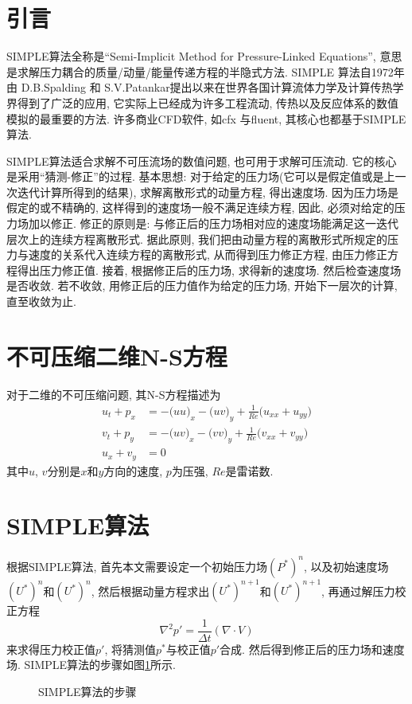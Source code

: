 \documentclass[a4paper,boxed,11pt]{caspset}
\begin{document}

\section{引言}
SIMPLE算法全称是``Semi-Implicit Method for Pressure-Linked Equations'',
意思是求解压力耦合的质量/动量/能量传递方程的半隐式方法. SIMPLE 算法自1972年由
D.B.Spalding 和 S.V.Patankar提出以来在世界各国计算流体力学及计算传热学界得到了广泛的应用,
它实际上已经成为许多工程流动, 传热以及反应体系的数值模拟的最重要的方法. 许多商业CFD软件, 如cfx 与fluent, 其核心也都基于SIMPLE
算法.

SIMPLE算法适合求解不可压流场的数值问题, 也可用于求解可压流动. 它的核心是采用``猜测-修正''的过程. 基本思想: 对于给定的压力场(它可以是假定值或是上一次迭代计算所得到的结果),
求解离散形式的动量方程, 得出速度场. 因为压力场是假定的或不精确的, 这样得到的速度场一般不满足连续方程, 因此, 必须对给定的压力场加以修正.
修正的原则是: 与修正后的压力场相对应的速度场能满足这一迭代层次上的连续方程离散形式. 据此原则, 我们把由动量方程的离散形式所规定的压力与速度的关系代入连续方程的离散形式,
从而得到压力修正方程, 由压力修正方程得出压力修正值. 接着, 根据修正后的压力场, 求得新的速度场. 然后检查速度场是否收敛. 若不收敛,
用修正后的压力值作为给定的压力场, 开始下一层次的计算, 直至收敛为止.
\section{不可压缩二维N-S方程}

对于二维的不可压缩问题, 其N-S方程描述为
\begin{align}
u_{t}+p_{x} & =-\big(uu\big)_{x}-\big(uv\big)_{y}+\frac{1}{Re}\big(u_{xx}+u_{yy}\big)\label{momentumU}\\
v_{t}+p_{y} & =-\big(uv\big)_{x}-\big(vv\big)_{y}+\frac{1}{Re}\big(v_{xx}+v_{yy}\big)\label{momentumV}\\
u_{x}+v_{y} & =0
\end{align}
其中$u$, $v$分别是$x$和$y$方向的速度, $p$为压强, $Re$是雷诺数.


\section{SIMPLE算法}

根据SIMPLE算法, 首先本文需要设定一个初始压力场$(P^{*})^{n}$, 以及初始速度场$(U^{*})^{n}$和$(U^{*})^{n}$,
然后根据动量方程求出$(U^{*})^{n+1}$和$(U^{*})^{n+1}$, 再通过解压力校正方程
\[
\nabla^{2}p'=\frac{1}{\Delta t}(\nabla\cdot V)
\]
来求得压力校正值$p'$, 将猜测值$p^{*}$与校正值$p'$合成. 然后得到修正后的压力场和速度场. SIMPLE算法的步骤如图\ref{steps}所示.
\newpage
\begin{figure}[!htb]
\centering

\caption{\label{steps}SIMPLE算法的步骤}
\end{figure}
\end{document}
